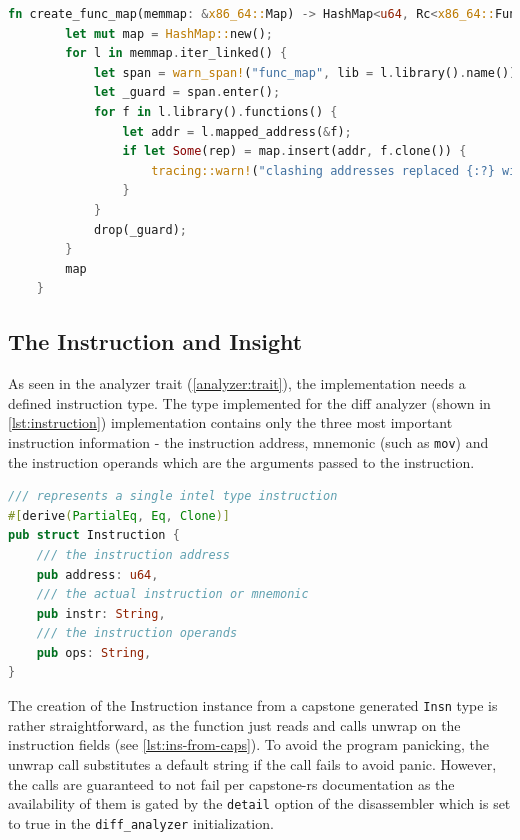 \begin{lstlisting}[caption=\label{lst:create-func-map}{Function responsible for creating a hash map of functions and their addresses}, language=Rust, breaklines=true]
    fn create_func_map(memmap: &x86_64::Map) -> HashMap<u64, Rc<x86_64::Function>> {
        let mut map = HashMap::new();
        for l in memmap.iter_linked() {
            let span = warn_span!("func_map", lib = l.library().name());
            let _guard = span.enter();
            for f in l.library().functions() {
                let addr = l.mapped_address(&f);
                if let Some(rep) = map.insert(addr, f.clone()) {
                    tracing::warn!("clashing addresses replaced {:?} with {:?}", rep, f);
                }
            }
            drop(_guard);
        }
        map
    }
\end{lstlisting}

\subsection{The Instruction and Insight}

As seen in the analyzer trait (\autoref{analyzer:trait}), the implementation needs a defined instruction type.
The type implemented for the diff analyzer (shown in \autoref{lst:instruction}) implementation contains only the three most important instruction information - the instruction address, mnemonic (such as \verb|mov|) and the instruction operands which are the arguments passed to the instruction.

\begin{lstlisting}[caption=\label{lst:instruction}{The instruction struct definition}, language=Rust]
/// represents a single intel type instruction
#[derive(PartialEq, Eq, Clone)]
pub struct Instruction {
    /// the instruction address
    pub address: u64,
    /// the actual instruction or mnemonic
    pub instr: String,
    /// the instruction operands
    pub ops: String,
}
\end{lstlisting}

The creation of the Instruction instance from a capstone generated \verb|Insn| type is rather straightforward, as the function just reads and calls unwrap on the instruction fields (see \autoref{lst:ins-from-caps}).
To avoid the program panicking, the unwrap call substitutes a default string if the call fails to avoid panic. However, the calls are guaranteed to not fail per capstone-rs documentation as the availability of them is gated by the \verb|detail| option of the disassembler which is set to true in the \verb|diff_analyzer| initialization.


